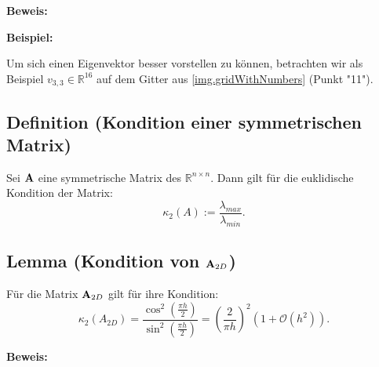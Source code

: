 \textbf{Beweis:}



\textbf{Beispiel:}

Um sich einen Eigenvektor besser vorstellen zu können, betrachten wir als Beispiel $v_{3,3} \in \mathbb{R}^{16}$ auf dem Gitter aus \autoref{img.gridWithNumbers} (Punkt "11").


\subsection{Definition (Kondition einer symmetrischen Matrix)}\label{ss.Definition Kondition einer Matrix}

Sei ${\textbf{A}}$ eine symmetrische Matrix des $\mathbb{R}^{n \times n}$. Dann gilt für die euklidische Kondition der Matrix:
\begin{equation}
\kappa_{2} (A) := \frac {\lambda_{max}} {\lambda_{min}}.\label{eq.Kondition}
\end{equation}

\subsection{Lemma (Kondition von ${\textbf{A}}_{2D}$)}\label{ss.Matrixkondition}

Für die Matrix ${\textbf{A}}_{2D}$ gilt für ihre Kondition:
\begin{equation}
\kappa_{2} (A_{2D}) = \frac {\cos^{2}(\frac{\pi h}{2})} {\sin^{2}(\frac{\pi h}{2})} = \left( \frac {2} {\pi h} \right)^{2} (1 + \mathcal{O}(h^{2})).
\end{equation}

\textbf{Beweis:}

